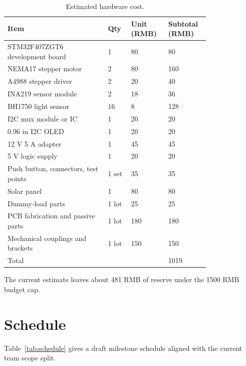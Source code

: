 \documentclass[11pt]{article}
\begin{document}
\begin{longtable}{p{0.43\linewidth} p{0.09\linewidth} p{0.14\linewidth} p{0.14\linewidth}}
\caption{Estimated hardware cost.\label{tab:cost}}\\
\toprule
Item & Qty & Unit (RMB) & Subtotal (RMB) \\
\midrule
STM32F407ZGT6 development board & 1 & 80 & 80 \\
NEMA17 stepper motor & 2 & 80 & 160 \\
A4988 stepper driver & 2 & 20 & 40 \\
INA219 sensor module & 2 & 18 & 36 \\
BH1750 light sensor & 16 & 8 & 128 \\
I2C mux module or IC & 1 & 20 & 20 \\
0.96 in I2C OLED & 1 & 20 & 20 \\
12 V 5 A adapter & 1 & 45 & 45 \\
5 V logic supply & 1 & 20 & 20 \\
Push button, connectors, test points & 1 set & 35 & 35 \\
Solar panel & 1 & 80 & 80 \\
Dummy-load parts & 1 lot & 25 & 25 \\
PCB fabrication and passive parts & 1 lot & 180 & 180 \\
Mechanical couplings and brackets & 1 lot & 150 & 150 \\
\midrule
Total &  &  & 1019 \\
\bottomrule
\end{longtable}

The current estimate leaves about 481 RMB of reserve under the 1500 RMB budget cap.

\section{Schedule}

Table~\ref{tab:schedule} gives a draft milestone schedule aligned with the current team scope split.
\end{document}
